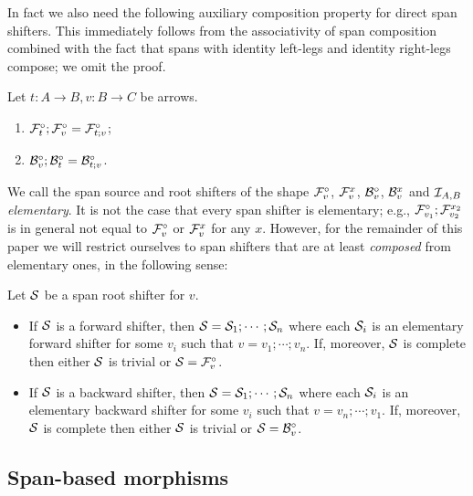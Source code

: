 %
In fact we also need the following auxiliary composition property for direct span shifters. This immediately follows from the associativity of span composition combined with the fact that spans with identity left-legs and identity right-legs compose; we omit the proof.
%
\begin{lemma}
Let $t:A\to B,v:B\to C$ be arrows.
\begin{enumerate}[topsep=\smallskipamount]
\item $\dF t;\dF v=\dF{t;v}$;
\item $\dB v;\dB t=\dB{t;v}$.
\end{enumerate}
\end{lemma}
%
We call the span source and root shifters of the shape $\dF v$, $\rF v x$, $\dB v$, $\rB v x$ and $\cI_{A,B}$ \emph{elementary}. It is not the case that every span shifter is elementary; e.g., $\dF{v_1};\rF{v_2}{x_2}$ is in general not equal to $\dF v$ or $\rF v x$ for any $x$. However, for the remainder of this paper we will restrict ourselves to span shifters that are at least \emph{composed} from elementary ones, in the following sense:
%

\begin{assumption} Let $\cS$ be a span root shifter for $v$.
\begin{itemize}[topsep=\smallskipamount]
\item If $\cS$ is a forward shifter, then $\cS = \cS_1;\cdots;\cS_n$ where each $\cS_i$ is an elementary forward shifter for some $v_i$ such that $v=v_1;\cdots;v_n$. If, moreover, $\cS$ is complete then either $\cS$ is trivial or $\cS=\dF v$.
\item If $\cS$ is a backward shifter, then $\cS = \cS_1;\cdots;\cS_n$ where each $\cS_i$ is an elementary backward shifter for some $v_i$ such that $v=v_n;\cdots;v_1$. If, moreover, $\cS$ is complete then either $\cS$ is trivial or $\cS=\dB{v}$.
\end{itemize}
\end{assumption}
 
\subsection{Span-based morphisms}

